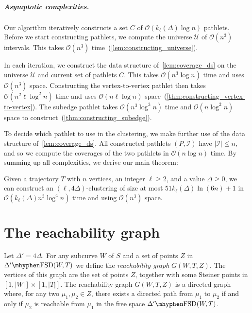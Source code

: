 \documentclass[a4paper,UKenglish,cleveref,thm-restate,notab]{lipics-v2021}
\newcommand{\FSD}[1][\Delta'] {\ensuremath{#1}\mhyphen\mathrm{FSD}}
\newcommand{\bigO}{\mathcal{O}}
\newcommand{\I}{\mathcal{I}}
\newcommand{\U}{\mathcal{U}}
\begin{document}
\subparagraph*{Asymptotic complexities.}

    Our algorithm iteratively constructs a set $C$ of $\bigO(k_\ell(\Delta) \log n)$ pathlets.
    Before we start constructing pathlets, we compute the universe $\U$ of $\bigO(n^3)$ intervals.
    This takes $\bigO(n^3)$ time~(\cref{lem:constructing_universe}).
    
    In each iteration, we construct the data structure of~\cref{lem:coverage_ds} on the universe $\U$ and current set of pathlets $C$.
    This takes $\bigO(n^3 \log n)$ time and uses $\bigO(n^3)$ space.
    Constructing the vertex-to-vertex pathlet then takes $\bigO(n^2 \ell \log^2 n)$ time and uses $\bigO(n \ell \log n)$ space~(\cref{thm:constructing_vertex-to-vertex}).
    The subedge pathlet takes $\bigO(n^3 \log^3 n)$ time and $\bigO(n \log^2 n)$ space to construct~(\cref{thm:constructing_subedge}).
    
    To decide which pathlet to use in the clustering, we make further use of the data structure of~\cref{lem:coverage_ds}.
    All constructed pathlets $(P, \I)$ have $|\I| \leq n$, and so we compute the coverages of the two pathlets in $\bigO(n \log n)$ time.
    By summing up all complexities, we derive our main theorem:
    
    \begin{theorem}
    \label{thm:yes-no-no}
        Given a trajectory $T$ with $n$ vertices, an integer $\ell \geq 2$, and  a value $\Delta \geq 0$, we can construct an $(\ell, 4\Delta)$-clustering of size at most $51 k_\ell(\Delta) \ln (6n) + 1$ in $\bigO(k_\ell(\Delta) n^3 \log^4 n)$ time and using $\bigO(n^3)$ space.
    \end{theorem}

\section{The reachability graph}
\label{sec:reachability_graph}

    Let $\Delta' = 4\Delta$.
    For any subcurve $W$ of $S$ and a set of points $Z$ in $\FSD(W, T)$ we define the \emph{reachability graph} $G(W, T, Z)$.
    The vertices of this graph are the set of points $Z$, together with some Steiner points in $[1, |W|] \times [1, |T|]$.
    The reachability graph $G(W, T, Z)$ is a directed graph where, for any two $\mu_1, \mu_2 \in Z$, there exists a directed path from $\mu_1$ to $\mu_2$ if and only if $\mu_2$ is reachable from $\mu_1$ in the free space $\FSD(W, T)$.
    
\end{document}
